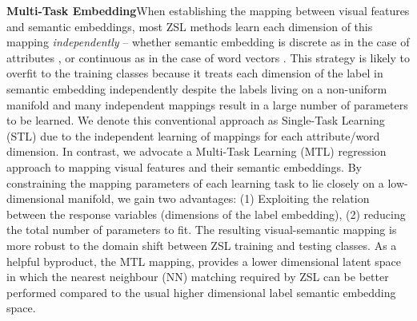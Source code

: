 \documentclass[runningheads]{llncs}
\begin{document}
\noindent\textbf{Multi-Task Embedding}\quad When
establishing the mapping between visual features and semantic
embeddings, most ZSL methods learn each dimension of this mapping
{\em independently} -- whether semantic embedding is discrete as in the
case of attributes \cite{Lampert2009,Akata2015}, or continuous as in
the case of word vectors \cite{Socher2013,FuXKG_CVPR15}. This strategy is  likely to overfit to the training
classes because it treats each dimension of the label
in semantic embedding independently despite the labels living on a
non-uniform manifold \cite{mahadevan2015matrixManifold} and many independent
mappings result in a large number of parameters to be learned. We denote this
conventional approach as Single-Task Learning (STL) due to
the independent learning of mappings for each attribute/word
dimension. In contrast, we advocate a Multi-Task Learning (MTL)
\cite{Evgeniou2004,Kumar2012,Pan2010} regression approach to mapping
visual features and their semantic embeddings. By 
constraining the mapping parameters of each learning task to lie closely on a
low-dimensional manifold, we gain two advantages: (1) Exploiting the
relation between the response variables (dimensions of the label
embedding), (2) reducing the total number of parameters to
fit. The resulting visual-semantic mapping is more robust to the
domain shift between ZSL training and testing classes.  As a helpful
byproduct, the MTL mapping, provides a lower dimensional latent space
in which the nearest neighbour (NN) matching required by ZSL can be better performed
\cite{Beyer1999} compared to the usual higher dimensional label
semantic embedding space.
\end{document}
